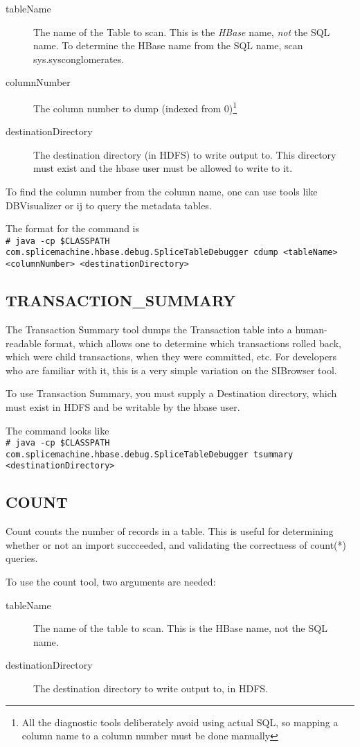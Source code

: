 \documentclass[10pt]{article}
\newcommand{\shellcmd}[1]{\\\indent\indent\texttt{\footnotesize\# #1}\\}
\begin{document}
\begin{description}
\item[tableName] The name of the Table to scan. This is the \emph{HBase} name, \emph{not} the SQL name. To determine the HBase name from the SQL name, scan sys.sysconglomerates.
\item[columnNumber] The column number to dump (indexed from 0)\footnote{All the diagnostic tools deliberately avoid using actual SQL, so mapping a column name to a column number must be done manually}
\item[destinationDirectory] The destination directory (in HDFS) to write output to. This directory must exist and the hbase user must be allowed to write to it.
\end{description}

To find the column number from the column name, one can use tools like DBVisualizer or ij to query the metadata tables.

The format for the command is
\shellcmd{java -cp \$CLASSPATH com.splicemachine.hbase.debug.SpliceTableDebugger cdump <tableName> <columnNumber> <destinationDirectory>}

\subsection{TRANSACTION\_SUMMARY}
The Transaction Summary tool dumps the Transaction table into a human-readable format, which allows one to determine which transactions rolled back, which were
child transactions, when they were committed, etc. For developers who are familiar with it, this is a very simple variation on the SIBrowser tool.

To use Transaction Summary, you must supply a Destination directory, which must exist in HDFS and be writable by the hbase user.

The command looks like
\shellcmd{java -cp \$CLASSPATH com.splicemachine.hbase.debug.SpliceTableDebugger tsummary <destinationDirectory>}

\subsection{COUNT}
Count counts the number of records in a table. This is useful for determining whether or not an import succceeded, and validating the correctness of count(*) queries.

To use the count tool, two arguments are needed:

\begin{description}
\item[tableName] The name of the table to scan. This is the HBase name, not the SQL name. 
\item[destinationDirectory] The destination directory to write output to, in HDFS.
\end{description}
\end{document}

